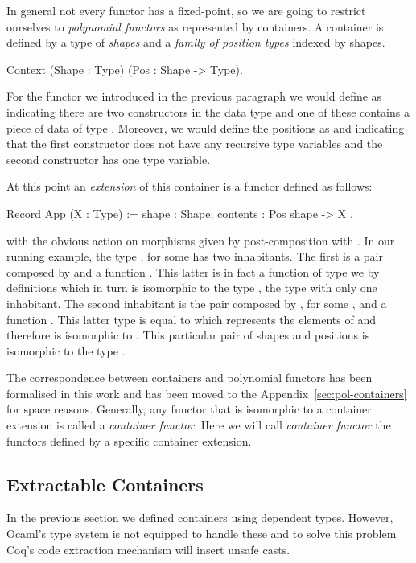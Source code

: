 \documentclass[anonymous, a4paper, UKenglish, cleveref, autoref, thm-restate]{lipics-v2021}
\begin{document}
In general not every functor has a fixed-point, so we are going to restrict
ourselves to \emph{polynomial functors} as represented by containers.  A
container is defined by a type of \emph{shapes} and a \emph{family of position
types} indexed by shapes.
\begin{coqcode}
Context (Shape : Type) (Pos : Shape -> Type).
\end{coqcode}
For the functor  we introduced in the previous paragraph we would
define  as  indicating there are two constructors in
the data type and one of these contains a piece of data of type .
Moreover, we would define the positions as 
and  indicating that the first constructor does not have
any recursive type variables and the second constructor has one type variable.

At this point an \emph{extension} of this container is a functor defined as
follows:
\begin{coqcode}
Record App (X : Type) := { shape : Shape; contents : Pos shape -> X }.
\end{coqcode}
with the obvious action on morphisms given by post-composition
with .  In our running example, the type , for
some  has two inhabitants.  The first is a pair composed
by  and a function . This latter is
in fact a function of type we   by definitions which in turn
is isomorphic to the type , the type with only one inhabitant.  The
second inhabitant is the pair composed by , for
some , and a function .  This latter type is
equal to  which represents the elements of  and therefore
is isomorphic to .  This particular pair of shapes and positions is
isomorphic to the type .

The correspondence between containers and polynomial functors has been
formalised in this work and has been moved to the
Appendix~\ref{sec:pol-containers} for space reasons. Generally, any functor that
is isomorphic to a container extension is called a \emph{container functor}.
Here we will call \emph{container functor} the functors defined by a specific
container extension.

\subsection{Extractable Containers}
In the previous section we defined containers using dependent types.  However,
Ocaml's type system is not equipped to handle these and to solve this problem
Coq's code extraction mechanism will insert unsafe casts.
\end{document}
